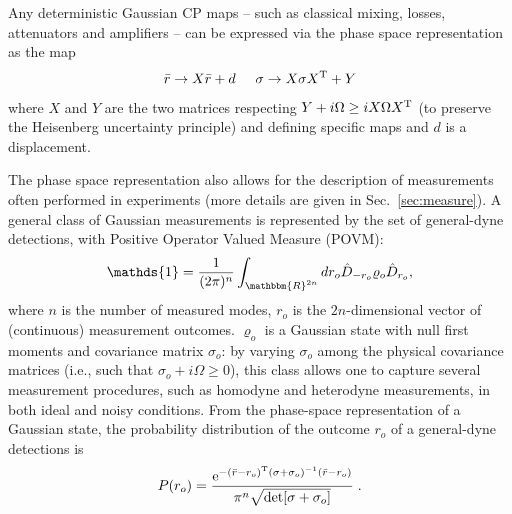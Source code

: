\documentclass[%
reprint,
superscriptaddress,
nofootinbib,
 amsmath,amssymb,
prx,
floatfix,
]{revtex4-2}
\begin{document}
Any deterministic Gaussian CP maps -- such as classical mixing, losses, attenuators and amplifiers -- can be expressed via the phase space representation as the map 
\begin{equation}
    \bar{r} \to X \bar{r} + d\hspace{0.5cm} \sigma \to X \sigma X^{\rm T} + Y 
\end{equation}
where $X$ and $Y$ are the two matrices respecting $Y + i \Omega \geq i X \Omega X^{\rm T}$ (to preserve the Heisenberg uncertainty principle) and defining specific maps and $d$ is a displacement.

The phase space representation also allows for the description of measurements often performed in experiments (more details are given in Sec.~\ref{sec:measure}). A general class of Gaussian measurements is represented by the set of general-dyne detections, with Positive Operator Valued Measure (POVM):
\begin{equation}
\label{eq:generadyne}
{\mathds{1}} = \frac{1}{(2\pi)^n} \int_{\mathbbm{R}^{2n}}dr_{o} \hat{D}_{-r_o} \varrho_o \hat{D}_{r_o} ,
\end{equation}
where $n$ is the number of measured modes, $r_{o}$ is the $2n$-dimensional vector of (continuous) measurement outcomes. $\varrho_o$ is a Gaussian state with null first moments and covariance matrix $\sigma_o$: by varying $\sigma_o$ among the physical covariance matrices (i.e., such that $\sigma_o+i\Omega\ge 0$), this class allows one to capture several measurement procedures, such as homodyne and heterodyne measurements, in both ideal and noisy conditions. From the phase-space representation of a Gaussian state, the probability distribution of the outcome $r_o$ of a general-dyne detections is 
\begin{equation}
    \label{eq:prob_generadyne_gaussian}
    P(r_o) =  \frac{{\rm e}^{ - (\bar{r} - r_o)^{\rm T} ( \sigma + \sigma_o )^{-1}  (\bar{r} - r_o) }}{\pi^n  \sqrt{ \text{det} [ \sigma + \sigma_o ] }} \;.
\end{equation}



\end{document}
